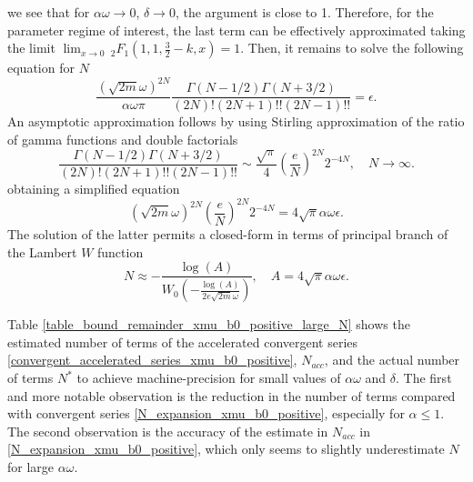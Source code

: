 \documentclass[10pt,a4paper,oneside]{article}
\numberwithin{equation}{section}
\begin{document}
we see that for $\alpha \omega \to 0$, $\delta \to 0$, the argument is close to 1. Therefore, for the parameter regime of interest, the last term can be effectively approximated taking the limit $\lim_{x \to 0}\, _2F_1\left(1, 1, \frac{3}{2}-k, x\right) = 1$. Then, it remains to solve the following equation for $N$ 
\begin{equation}
\frac{(\sqrt{2m} \omega)^{2N}}{\alpha\omega \pi} \frac{\Gamma(N - 1/2)\Gamma(N + 3/2)}{(2N)!(2N + 1)!! (2N - 1)!!} = \epsilon.
\end{equation}
An asymptotic approximation follows by using Stirling approximation of the ratio of gamma functions and double factorials
\begin{equation}
\frac{\Gamma(N - 1/2)\Gamma(N + 3/2)}{(2N)!(2N + 1)!! (2N - 1)!!} \sim \frac{\sqrt{\pi}}{4} \left(\frac{e}{N}\right)^{2N} 2^{-4N}, \quad N \to \infty.
\end{equation}
obtaining a simplified equation
\begin{equation}
(\sqrt{2m} \omega)^{2N} \left(\frac{e}{N}\right)^{2N} 2^{-4N} = 4\sqrt{\pi}\alpha\omega\epsilon.
\end{equation}
The solution of the latter permits a closed-form in terms of principal branch of the Lambert $W$ function
\begin{equation}\label{N_expansion_xmu_acc}
N \approx - \frac{\log(A)}{W_0\left(-\frac{\log(A)}{2 e \sqrt{2m} \omega} \right)}, \quad A = 4\sqrt{\pi}\alpha\omega\epsilon.
\end{equation}

Table \ref{table_bound_remainder_xmu_b0_positive_large_N} shows the estimated number of terms of the accelerated convergent series \eqref{convergent_accelerated_series_xmu_b0_positive}, $N_{acc}$, and the actual number of terms $N^*$ to achieve machine-precision for small values of $\alpha\omega$ and $\delta$. The first and more notable observation is the reduction in the number of terms compared with convergent series \eqref{N_expansion_xmu_b0_positive}, especially for $\alpha \le 1$. The second observation is the accuracy of the estimate in $N_{acc}$ in \eqref{N_expansion_xmu_b0_positive}, which only seems to slightly underestimate $N$ for large $\alpha\omega$.
\end{document}
